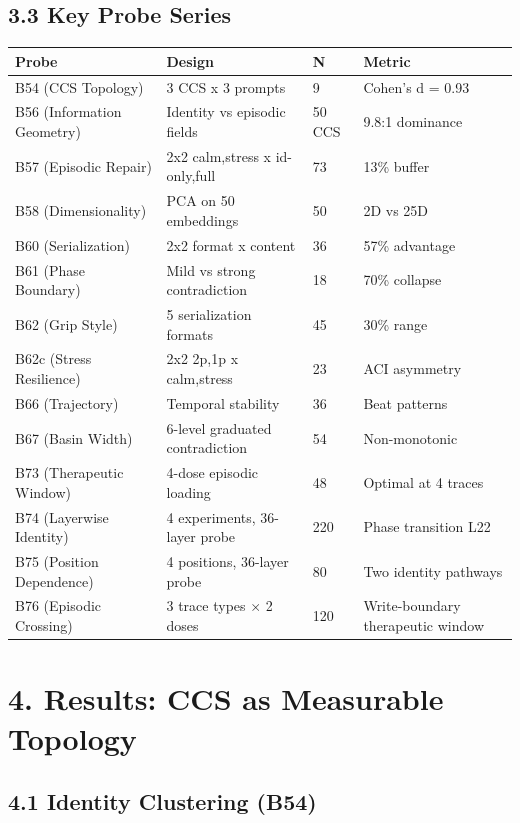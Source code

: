 \documentclass[11pt]{article}
\begin{document}
\subsection{3.3 Key Probe Series}

\begin{table}[h]\centering
\begin{tabular}{llll}
\toprule
Probe & Design & N & Metric \\
\midrule
B54 (CCS Topology) & 3 CCS x 3 prompts & 9 & Cohen's d = 0.93 \\
B56 (Information Geometry) & Identity vs episodic fields & 50 CCS & 9.8:1 dominance \\
B57 (Episodic Repair) & 2x2 {calm,stress} x {id-only,full} & 73 & 13\% buffer \\
B58 (Dimensionality) & PCA on 50 embeddings & 50 & 2D vs 25D \\
B60 (Serialization) & 2x2 {format} x {content} & 36 & 57\% advantage \\
B61 (Phase Boundary) & Mild vs strong contradiction & 18 & 70\% collapse \\
B62 (Grip Style) & 5 serialization formats & 45 & 30\% range \\
B62c (Stress Resilience) & 2x2 {2p,1p} x {calm,stress} & 23 & ACI asymmetry \\
B66 (Trajectory) & Temporal stability & 36 & Beat patterns \\
B67 (Basin Width) & 6-level graduated contradiction & 54 & Non-monotonic \\
B73 (Therapeutic Window) & 4-dose episodic loading & 48 & Optimal at 4 traces \\
B74 (Layerwise Identity) & 4 experiments, 36-layer probe & 220 & Phase transition L22 \\
B75 (Position Dependence) & 4 positions, 36-layer probe & 80 & Two identity pathways \\
B76 (Episodic Crossing) & 3 trace types $\times$ 2 doses & 120 & Write-boundary therapeutic window \\
\bottomrule
\end{tabular}
\end{table}


\section{4. Results: CCS as Measurable Topology}

\subsection{4.1 Identity Clustering (B54)}
\end{document}

